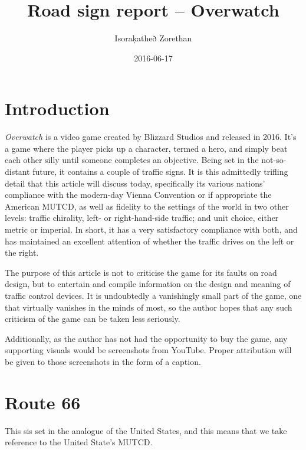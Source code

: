 \documentclass{article}
\begin{document}
\title{Road sign report – Overwatch}
\date{2016-06-17}
\author{Isoraķatheð Zorethan}
\maketitle

\section{Introduction}
\textit{Overwatch} is a video game created by Blizzard Studios
and released in 2016.
It's a game where the player picks up a character, termed a hero,
and simply beat each other silly until someone completes an objective.
Being set in the not-so-distant future, it contains a couple of traffic signs.
It is this admittedly trifling detail that this article will discuss today,
specifically its various nations' compliance with the modern-day
Vienna Convention or if appropriate the American MUTCD,
as well as fidelity to the settings of the world in two other levels:
traffic chirality, left- or right-hand-side traffic;
and unit choice, either metric or imperial.
In short, it has a very satisfactory compliance with both,
and has maintained an excellent attention
of whether the traffic drives on the left or the right.

The purpose of this article
is not to criticise the game for its faults on road design,
but to entertain and compile information
on the design and meaning of traffic control devices.
It is undoubtedly a vanishingly small part of the game,
one that virtually vanishes in the minds of most,
so the author hopes that any such criticism of the game
can be taken less seriously.

Additionally, as the author has not had the opportunity to buy the game,
any supporting visuals would be screenshots from YouTube.
Proper attribution will be given to those screenshots in the form of a caption.

\section{Route 66}
This sis set in the analogue of the United States,
and this means that we take reference to the United State's MUTCD.

\end{document}
